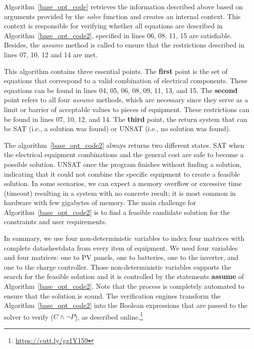 \documentclass[a4paper,donotrepeattitle,fleqn]{cas-dc}
\begin{document}
Algorithm~\ref{base_opt_code} retrieves the information described above based on arguments provided by the \textit{solve} function and creates an internal context. This context is responsible for verifying whether all equations are described in Algorithm~\ref{base_opt_code2}, specified in lines 06, 08, 11, 15 are satisfiable. Besides, the \textit{assume} method is called to ensure that the restrictions described in lines 07, 10, 12 and 14 are met.

This algorithm contains three essential points. The \textbf{first} point is the set of equations that correspond to a valid combination of electrical components. These equations can be found in lines 04, 05, 06, 08, 09, 11, 13, and 15. The \textbf{second} point refers to all four \textit{assume} methods, which are necessary since they serve as a limit or barrier of acceptable values to pieces of equipment. These restrictions can be found in lines 07, 10, 12, and 14. The \textbf{third} point, the return system that can be SAT (i.e., a solution was found) or UNSAT (i.e., no solution was found).

The algorithm~\ref{base_opt_code2} always returns two different states. SAT when the electrical equipment combinations and the general cost are safe to become a possible solution.  UNSAT once the program finishes without finding a solution, indicating that it could not combine the specific equipment to create a feasible solution. In some scenarios, we can expect a memory overflow or excessive time (timeout) resulting in a system with no concrete result; it is most common in hardware with few gigabytes of memory. The main challenge for Algorithm~\ref{base_opt_code2} is to find a feasible candidate solution for the constraints and user requirements.

In summary, we use four non-deterministic variables to index four matrices with complete datasheet\footnotemark[\value{footnote}] data from every item of equipment. We used four variables and four matrices: one to PV panels, one to batteries, one to the inverter, and one to the charge controller. Those non-deterministic variables supports the search for the feasible solution and it is controlled by the statements \textbf{assume} of Algorithm~\ref{base_opt_code2}. Note that the process is completely automated to ensure that the solution is sound. The verification engines transform the Algorithm~\ref{base_opt_code2} into the Boolean expressions that are passed to the solver to verify ($C \wedge \neg P$), as described online.\footnote{\href{https://cutt.ly/gz1Y159}{https://cutt.ly/gz1Y159}}
\end{document}
